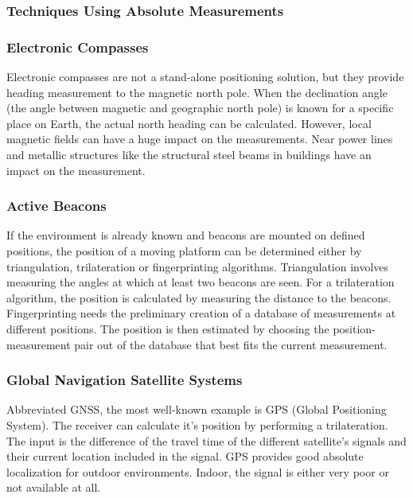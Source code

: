 \subsubsection{Techniques Using Absolute Measurements}

\subsubsection*{Electronic Compasses}

Electronic compasses are not a stand-alone positioning solution, but they provide heading measurement to the magnetic north pole. When the declination  angle (the angle between magnetic and geographic north pole) is known for a specific place on Earth, the actual north heading can be calculated. However, local magnetic fields can have a huge impact on the measurements. Near power lines and metallic structures like the structural steel beams in buildings have an impact on the measurement.

\subsubsection*{Active Beacons}

If the environment is already known and beacons are mounted on defined positions, the position of a moving platform can be determined either by triangulation, trilateration or fingerprinting algorithms. Triangulation involves measuring the angles at which at least two beacons are seen. For a trilateration algorithm, the position is calculated by measuring the distance to the beacons. Fingerprinting needs the preliminary creation of a database of measurements at different positions. The position is then estimated by choosing the position-measurement pair out of the database that best fits the current measurement.

\subsubsection*{Global Navigation Satellite Systems}

Abbreviated GNSS, the most well-known example is GPS (Global Positioning System). The receiver can calculate it's position by performing a trilateration. The input is the difference of the travel time of the different satellite's signals and their current location included in the signal. GPS provides good absolute localization for outdoor environments. Indoor, the signal is either very poor or not available at all. %

